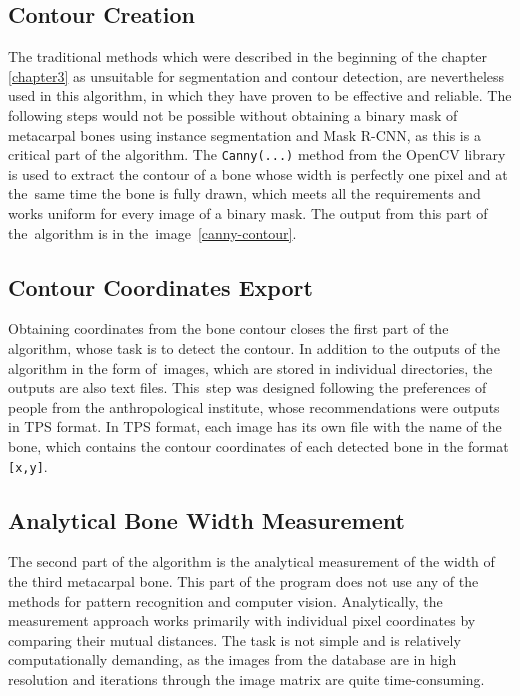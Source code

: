 \subsection{Contour Creation}
The traditional methods which were described in the beginning of the chapter \ref{chapter3} as unsuitable for segmentation and contour detection, are nevertheless used in this algorithm, in which they have proven to be effective and reliable. The following steps would not be possible without obtaining a binary mask of metacarpal bones using instance segmentation and Mask R-CNN, as this is a critical part of the algorithm. The \texttt {Canny(...)} method from the OpenCV library is used to extract the contour of a bone whose width is perfectly one pixel and at the~same time the bone is fully drawn, which meets all the requirements and works uniform for every image of a binary mask. The output from this part of the~algorithm is in the~image~\ref{canny-contour}.

\subsection{Contour Coordinates Export}
Obtaining coordinates from the bone contour closes the first part of the algorithm, whose task is to detect the contour. In addition to the outputs of the algorithm in the form of~images, which are stored in individual directories, the outputs are also text files. This~step was designed following the preferences of people from the anthropological institute, whose recommendations were outputs in TPS format. In TPS format, each image has its own file with the name of the bone, which contains the contour coordinates of each detected bone in the format \texttt {[x,y]}.

\subsection{Analytical Bone Width Measurement}
The second part of the algorithm is the analytical measurement of the width of the third metacarpal bone. This part of the program does not use any of the methods for pattern recognition and computer vision. Analytically, the measurement approach works primarily with individual pixel coordinates by comparing their mutual distances. The task is not simple and is relatively computationally demanding, as the images from the database are in high resolution and iterations through the image matrix are quite time-consuming.

